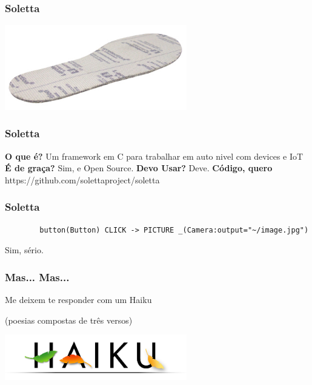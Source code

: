 \documentclass{beamer}
\begin{document}
\begin{frame} \frametitle{ Soletta }
        \includegraphics[width=300px]{images/soletta}
\end{frame}

\begin{frame} \frametitle{ Soletta }
    \textbf{O que é?}
\linebreak
\linebreak
    Um framework em C para trabalhar em auto nivel com devices e IoT
\linebreak
\linebreak
    \textbf{É de graça?}
\linebreak
\linebreak
    Sim, e Open Source.
\linebreak
\linebreak
    \textbf{Devo Usar?}
\linebreak
\linebreak
    Deve.
\linebreak
\linebreak
    \textbf{Código, quero}
\linebreak
\linebreak
    https://github.com/solettaproject/soletta
\end{frame}

\begin{frame}[fragile] \frametitle{ Soletta }
    \begin{lstlisting}
        button(Button) CLICK -> PICTURE _(Camera:output="~/image.jpg")
    \end{lstlisting}
    \pause

    Sim, sério.
\end{frame}

\begin{frame} \frametitle{Mas... Mas...}
    Me deixem te responder com um Haiku

    \begin{center}
     (poesias compostas de três versos)
    \end{center}

    \includegraphics[width=300px]{images/haiku}
\end{frame}
\end{document}
